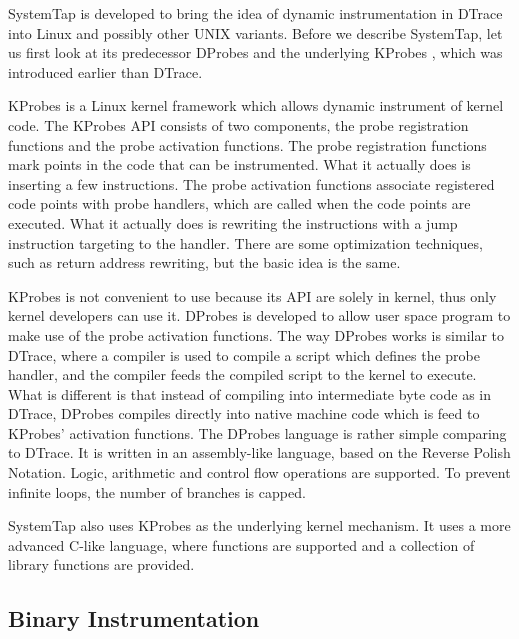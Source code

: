 SystemTap \cite{prasad2005systemtap} is developed to bring the idea of dynamic instrumentation
in DTrace into Linux and possibly other UNIX variants.
Before we describe SystemTap, let us first look at its predecessor
DProbes \cite{moore2001dprobes} and the underlying KProbes \cite{mavinakayanahalli2006kprobes},
which was introduced earlier than DTrace.

KProbes is a Linux kernel framework which allows dynamic instrument
of kernel code.
The KProbes API consists of two components, the probe registration
functions and the probe activation functions.
The probe registration functions mark points in the code that can be
instrumented.
What it actually does is inserting a few  instructions.
The probe activation functions associate registered code points
with probe handlers, which are called when the code points are executed.
What it actually does is rewriting the  instructions with
a jump instruction targeting to the handler.
There are some optimization techniques, such as return address rewriting,
but the basic idea is the same.

KProbes is not convenient to use because its API are solely in kernel,
thus only kernel developers can use it.
DProbes is developed to allow user space program to make use of the
probe activation functions.
The way DProbes works is similar to DTrace, where a compiler
is used to compile a script which defines the probe handler,
and the compiler feeds the compiled script to the kernel
to execute.
What is different is that instead of compiling into intermediate
byte code as in DTrace, DProbes compiles directly into native machine code
which is feed to KProbes' activation functions.
The DProbes language is rather simple comparing to DTrace.
It is written in an assembly-like language,
based on the Reverse Polish Notation.
Logic, arithmetic and control flow operations are supported.
To prevent infinite loops, the number of branches is capped.

SystemTap also uses KProbes as the underlying kernel mechanism.
It uses a more advanced C-like language, where functions are
supported and a collection of library functions are provided.

\subsection{Binary Instrumentation}
\label{sec:instrumentation}

